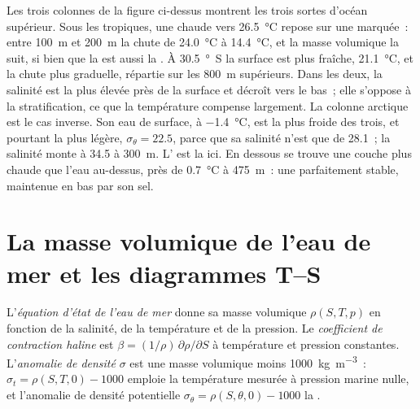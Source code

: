 Les trois colonnes de la figure ci-dessus montrent les trois sortes d'océan supérieur. Sous
les tropiques, une  chaude vers \qty{26.5}{\celsius} repose sur une 
marquée~: entre \qty{100}{m} et \qty{200}{m} la 
chute de \qty{24.0}{\celsius} à \qty{14.4}{\celsius}, et la masse volumique la suit,
si bien que la  est aussi la . À \qty{30.5}{\degree S} la
surface est plus fraîche, \qty{21.1}{\celsius}, et la chute plus graduelle, répartie sur
les \qty{800}{m} supérieurs. Dans les deux, la salinité est la plus élevée près de la surface et
décroît vers le bas~; elle s'oppose à la stratification, ce que la température
compense largement. La colonne arctique
est le cas inverse. Son eau de surface, à \qty{-1.4}{\celsius}, est la plus froide
des trois, et pourtant la plus légère, $\sigma_\theta = 22.5$, parce que sa salinité n'est
que de \num{28.1}~; la salinité monte à \num{34.5} à \qty{300}{m}. L' est
la  ici. En dessous se trouve une couche plus chaude que l'eau au-dessus, près de
\qty{0.7}{\celsius} à \qty{475}{m}~: une  parfaitement
stable, maintenue en bas par son sel.

\section{La masse volumique de l'eau de mer et les diagrammes T--S}\label{sec:b1:fluid-envelopes-structure:ts}

\begin{definition}\label{def:b1:fluid-envelopes-structure:eos}
L'\emph{équation d'état de l'eau de mer}
donne sa masse volumique $\rho(S, T, p)$ en fonction de la salinité, de la température et de la
pression. Le \emph{coefficient de contraction haline} est $\beta = (1/\rho)\,\partial\rho/\partial S$ à température et pression
constantes. L'\emph{anomalie de densité}
$\sigma$ est une masse volumique moins \qty{1000}{kg.m^{-3}}~: $\sigma_t = \rho(S, T, 0) -
1000$ emploie la température mesurée à pression marine nulle, et l'anomalie
de densité potentielle $\sigma_\theta = \rho(S, \theta, 0) - 1000$ la .
\end{definition}

